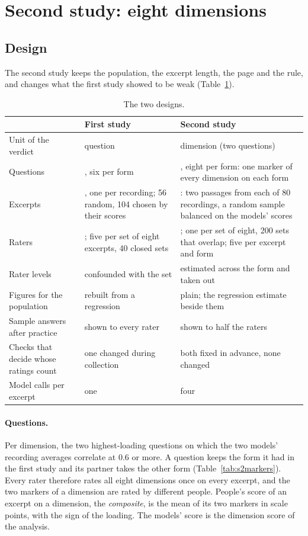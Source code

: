 \section{Second study: eight dimensions}\label{sec:second}

\subsection{Design}\label{sec:seconddesign}

The second study keeps the population, the excerpt length, the page and the rule, and changes what the first
study showed to be weak (Table~\ref{tab:s2design}).

\begin{table}[!htb]\centering
\caption{The two designs.}\label{tab:s2design}
\footnotesize
\begin{tabularx}{\textwidth}{@{}l>{\raggedright\arraybackslash}X>{\raggedright\arraybackslash}X@{}}
\toprule
 & First study & Second study \\
\midrule
Unit of the verdict & question & dimension (two questions) \\
Questions & 12, six per form & 16, eight per form: one marker of every dimension on each form \\
Excerpts & 160, one per recording; 56 random, 104 chosen by their scores & 160: two passages from each of 80
recordings, a random sample balanced on the models' scores \\
Raters & 205; five per set of eight excerpts, 40 closed sets & 211; one per set of eight, 200 sets that overlap;
five per excerpt and form \\
Rater levels & confounded with the set & estimated across the form and taken out \\
Figures for the population & rebuilt from a regression & plain; the regression estimate beside them \\
Sample answers after practice & shown to every rater & shown to half the raters \\
Checks that decide whose ratings count & one changed during collection & both fixed in advance, none changed \\
Model calls per excerpt & one & four \\
\bottomrule
\end{tabularx}
\end{table}

\paragraph{Questions.} Per dimension, the two highest-loading questions on which the two models' recording
averages correlate at 0.6 or more. A question keeps the form it had in the first study and its partner takes the
other form (Table~\ref{tab:s2markers}). Every rater therefore rates all eight dimensions once on every excerpt,
and the two markers of a dimension are rated by different people. People's score of an excerpt on a dimension,
the \emph{composite}, is the mean of its two markers in scale points, with the sign of the loading. The models'
score is the dimension score of the analysis.

